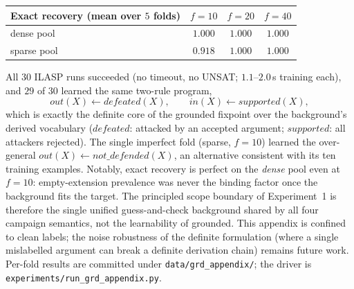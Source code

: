 \documentclass[review,12pt]{elsarticle}
\theoremstyle{definition}
\theoremstyle{remark}
\begin{document}
\begin{center}
\begin{tabular}{lccc}
\hline
Exact recovery (mean over $5$ folds) & $f{=}10$ & $f{=}20$ & $f{=}40$\\
\hline
dense pool  & $1.000$ & $1.000$ & $1.000$\\
sparse pool & $0.918$ & $1.000$ & $1.000$\\
\hline
\end{tabular}
\end{center}

All $30$ ILASP runs succeeded (no timeout, no UNSAT; $1.1$--$2.0$\,s training
each), and $29$ of $30$ learned the same two-rule program,
\[
\mathit{out}(X) \leftarrow \mathit{defeated}(X), \qquad
\mathit{in}(X) \leftarrow \mathit{supported}(X),
\]
which is exactly the definite core of the grounded fixpoint over the
background's derived vocabulary ($\mathit{defeated}$: attacked by an accepted
argument; $\mathit{supported}$: all attackers rejected). The single imperfect
fold (sparse, $f{=}10$) learned the over-general
$\mathit{out}(X) \leftarrow \mathit{not\_defended}(X)$, an alternative
consistent with its ten training examples. Notably, exact recovery is perfect
on the \emph{dense} pool even at $f{=}10$: empty-extension prevalence was
never the binding factor once the background fits the target. The principled
scope boundary of Experiment~1 is therefore the single unified
guess-and-check background shared by all four campaign semantics, not the
learnability of grounded. This appendix is confined to clean labels; the
noise robustness of the definite formulation (where a single mislabelled
argument can break a definite derivation chain) remains future work.
Per-fold results are committed under \texttt{data/grd\_appendix/}; the driver
is \texttt{experiments/run\_grd\_appendix.py}.
\end{document}
